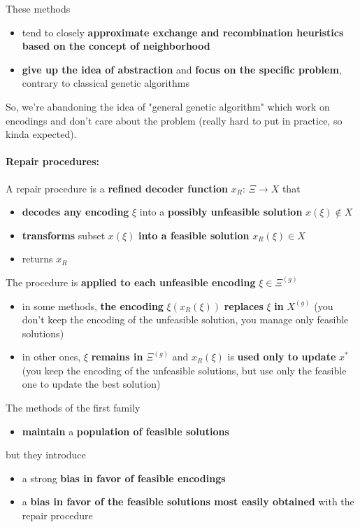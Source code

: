 These methods
\begin{itemize}
	\item tend to closely \textbf{approximate exchange and recombination heuristics based on the concept of neighborhood}
	\item \textbf{give up the idea of abstraction} and \textbf{focus on the specific problem}, contrary to classical genetic algorithms
\end{itemize}
So, we're abandoning the idea of "general genetic algorithm" which work on encodings and don't care about the problem (really hard to put in practice, so kinda expected).\\

\newpage

\paragraph{Repair procedures:} A repair procedure is a \textbf{refined decoder function} $x_R : \, \Xi \rightarrow X$ that 
\begin{itemize}
	\item \textbf{decodes any encoding} $\xi$ into a \textbf{possibly unfeasible solution} $x (\xi) \notin X$
	\item \textbf{transforms} subset $x (\xi)$ \textbf{into a feasible solution} $x_R (\xi) \in X$
	\item returns $x_R$
\end{itemize}

The procedure is \textbf{applied to each unfeasible encoding} $\xi \in \Xi^{(g)}$
\begin{itemize}
	\item in some methods, \textbf{the encoding} $\xi (x_R (\xi))$ \textbf{replaces} $\xi$ \textbf{in} $X^{(g)}$ (you don't keep the encoding of the unfeasible solution, you manage only feasible solutions)
	\item in other ones, $\xi$ \textbf{remains in} $\Xi^{(g)}$ and $x_R (\xi)$ is \textbf{used only to update} $x^\ast$ (you keep the encoding of the unfeasible solutions, but use only the feasible one to update the best solution)
\end{itemize}

The methods of the first family
\begin{itemize}
	\item \textbf{maintain} a \textbf{population of feasible solutions}
\end{itemize}

but they introduce
\begin{itemize}
	\item a strong \textbf{bias in favor of feasible encodings}
	\item a \textbf{bias in favor of the feasible solutions most easily obtained} with the repair procedure
\end{itemize}

